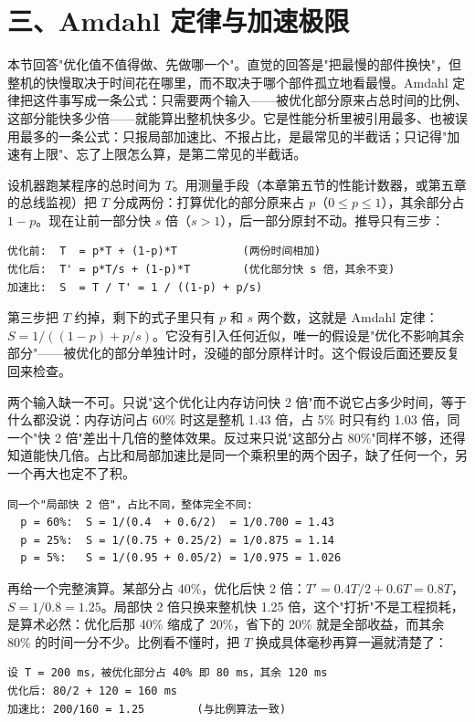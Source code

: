 \section{三、Amdahl 定律与加速极限}

本节回答"优化值不值得做、先做哪一个"。直觉的回答是"把最慢的部件换快"，但整机的快慢取决于时间花在哪里，而不取决于哪个部件孤立地看最慢。Amdahl 定律把这件事写成一条公式：只需要两个输入——被优化部分原来占总时间的比例、这部分能快多少倍——就能算出整机快多少。它是性能分析里被引用最多、也被误用最多的一条公式：只报局部加速比、不报占比，是最常见的半截话；只记得"加速有上限"、忘了上限怎么算，是第二常见的半截话。

设机器跑某程序的总时间为 $T$。用测量手段（本章第五节的性能计数器，或第五章的总线监视）把 $T$ 分成两份：打算优化的部分原来占 $p$（$0\le p\le1$），其余部分占 $1-p$。现在让前一部分快 $s$ 倍（$s>1$），后一部分原封不动。推导只有三步：

\begin{lstlisting}
优化前:  T  = p*T + (1-p)*T          (两份时间相加)
优化后:  T' = p*T/s + (1-p)*T        (优化部分快 s 倍，其余不变)
加速比:  S  = T / T' = 1 / ((1-p) + p/s)
\end{lstlisting}

第三步把 $T$ 约掉，剩下的式子里只有 $p$ 和 $s$ 两个数，这就是 Amdahl 定律：$S=1/((1-p)+p/s)$。它没有引入任何近似，唯一的假设是"优化不影响其余部分"——被优化的部分单独计时，没碰的部分原样计时。这个假设后面还要反复回来检查。

两个输入缺一不可。只说"这个优化让内存访问快 2 倍"而不说它占多少时间，等于什么都没说：内存访问占 60\% 时这是整机 1.43 倍，占 5\% 时只有约 1.03 倍，同一个"快 2 倍"差出十几倍的整体效果。反过来只说"这部分占 80\%"同样不够，还得知道能快几倍。占比和局部加速比是同一个乘积里的两个因子，缺了任何一个，另一个再大也定不了积。

\begin{lstlisting}
同一个"局部快 2 倍"，占比不同，整体完全不同:
  p = 60%:  S = 1/(0.4  + 0.6/2)  = 1/0.700 = 1.43
  p = 25%:  S = 1/(0.75 + 0.25/2) = 1/0.875 = 1.14
  p = 5%:   S = 1/(0.95 + 0.05/2) = 1/0.975 = 1.026
\end{lstlisting}

再给一个完整演算。某部分占 40\%，优化后快 2 倍：$T'=0.4T/2+0.6T=0.8T$，$S=1/0.8=1.25$。局部快 2 倍只换来整机快 1.25 倍，这个"打折"不是工程损耗，是算术必然：优化后那 40\% 缩成了 20\%，省下的 20\% 就是全部收益，而其余 80\% 的时间一分不少。比例看不懂时，把 $T$ 换成具体毫秒再算一遍就清楚了：

\begin{lstlisting}
设 T = 200 ms，被优化部分占 40% 即 80 ms，其余 120 ms
优化后: 80/2 + 120 = 160 ms
加速比: 200/160 = 1.25        (与比例算法一致)
\end{lstlisting}

